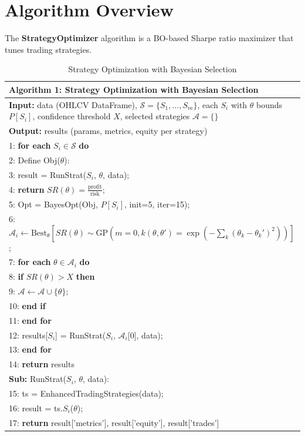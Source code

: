 \section{Algorithm Overview}
The \textbf{StrategyOptimizer} algorithm is a BO-based Sharpe ratio maximizer that tunes trading strategies. 

\begin{table}[h]
\small
\centering
\begin{tabular}{|p{12cm}|}
\hline
\textbf{Algorithm 1: Strategy Optimization with Bayesian Selection} \\
\hline
\textbf{Input:} data (OHLCV DataFrame), $\mathcal{S} = \{ S_1, \ldots, S_m \}$, each $S_i$ with $\theta$ bounds $P[S_i]$, confidence threshold $X$, selected strategies $\mathcal{A} = \{ \}$ \\
\textbf{Output:} results (params, metrics, equity per strategy) \\
\hline
1: \textbf{for each} $S_i \in \mathcal{S}$ \textbf{do} \\
2: \quad Define Obj($\theta$): \\
3: \quad\quad result = RunStrat($S_i$, $\theta$, data); \\
4: \quad\quad \textbf{return} $SR(\theta) = \frac{\text{profit}}{\text{risk}}$; \\
5: \quad Opt = BayesOpt(Obj, $P[S_i]$, init=5, iter=15); \\
6: \quad $\mathcal{A}_i \leftarrow \text{Best}_\theta \left[ SR(\theta) \sim \text{GP}(m=0, k(\theta, \theta')=\exp(-\sum_k (\theta_k - \theta_k')^2)) \right]$; \\
7: \quad \textbf{for each} $\theta \in \mathcal{A}_i$ \textbf{do} \\
8: \quad\quad \textbf{if} $SR(\theta) > X$ \textbf{then} \\
9: \quad\quad\quad $\mathcal{A} \leftarrow \mathcal{A} \cup \{ \theta \}$; \\
10: \quad\quad \textbf{end if} \\
11: \quad \textbf{end for} \\
12: \quad results[$S_i$] = RunStrat($S_i$, $\mathcal{A}_i$[0], data); \\
13: \textbf{end for} \\
14: \textbf{return} results \\
\textbf{Sub:} RunStrat($S_i$, $\theta$, data): \\
15: \quad ts = EnhancedTradingStrategies(data); \\
16: \quad result = ts.$S_i$($\theta$); \\
17: \quad \textbf{return} result['metrics'], result['equity'], result['trades'] \\
\hline
\end{tabular}
\caption{Strategy Optimization with Bayesian Selection}
\label{tab:strategy_optimizer}
\end{table}


